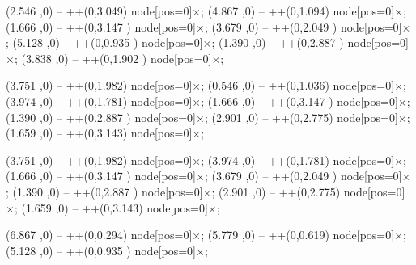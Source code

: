 \documentclass{beamer}
\begin{document}
\begin{zframe}{}
\begin{scope}[x=1cm,y=1cm,shift=(scope),thick]
   (2.546 ,0) -- ++(0,3.049) node[pos=0]{$\mathbf{\times}$};
   (4.867 ,0) -- ++(0,1.094) node[pos=0]{$\mathbf{\times}$};
   (1.666 ,0) -- ++(0,3.147 ) node[pos=0]{$\mathbf{\times}$};
   (3.679 ,0) -- ++(0,2.049 ) node[pos=0]{$\mathbf{\times}$};
   (5.128 ,0) -- ++(0,0.935 ) node[pos=0]{$\mathbf{\times}$};
   (1.390 ,0) -- ++(0,2.887 ) node[pos=0]{$\mathbf{\times}$};
   (3.838 ,0) -- ++(0,1.902 ) node[pos=0]{$\mathbf{\times}$};
                                                                            
   (3.751 ,0) -- ++(0,1.982) node[pos=0]{$\mathbf{\times}$};
   (0.546 ,0) -- ++(0,1.036) node[pos=0]{$\mathbf{\times}$};
   (3.974 ,0) -- ++(0,1.781) node[pos=0]{$\mathbf{\times}$};
   (1.666 ,0) -- ++(0,3.147 ) node[pos=0]{$\mathbf{\times}$};
   (1.390 ,0) -- ++(0,2.887 ) node[pos=0]{$\mathbf{\times}$};
   (2.901 ,0) -- ++(0,2.775) node[pos=0]{$\mathbf{\times}$};
   (1.659 ,0) -- ++(0,3.143) node[pos=0]{$\mathbf{\times}$};
                                                                             
   (3.751 ,0) -- ++(0,1.982) node[pos=0]{$\mathbf{\times}$};
   (3.974 ,0) -- ++(0,1.781) node[pos=0]{$\mathbf{\times}$};
   (1.666 ,0) -- ++(0,3.147 ) node[pos=0]{$\mathbf{\times}$};
   (3.679 ,0) -- ++(0,2.049 ) node[pos=0]{$\mathbf{\times}$};
   (1.390 ,0) -- ++(0,2.887 ) node[pos=0]{$\mathbf{\times}$};
   (2.901 ,0) -- ++(0,2.775) node[pos=0]{$\mathbf{\times}$};
   (1.659 ,0) -- ++(0,3.143) node[pos=0]{$\mathbf{\times}$};
                                                                              
   (6.867 ,0) -- ++(0,0.294) node[pos=0]{$\mathbf{\times}$};
   (5.779 ,0) -- ++(0,0.619) node[pos=0]{$\mathbf{\times}$};
   (5.128 ,0) -- ++(0,0.935 ) node[pos=0]{$\mathbf{\times}$};
                                                                            

\end{scope}
\end{zframe}
\end{document}
